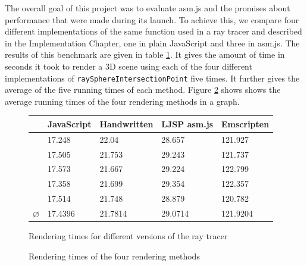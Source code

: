 \documentclass[11pt]{report}
\begin{document}
The overall goal of this project was to evaluate asm.js and the promises about performance that were made during its launch. To achieve this, we compare four different implementations of the same function used in a ray tracer and described in the Implementation Chapter, one in plain JavaScript and three in asm.js. The results of this benchmark are given in table \ref{benchmarks}. It gives the amount of time in seconds it took to render a 3D scene using each of the four different implementations of \texttt{raySphereIntersectionPoint} five times. It further gives the average of the five running times of each method. Figure \ref{benchmarksgraph} shows shows the average running times of the four rendering methods in a graph.

\begin{figure}[ht]
\begin{center}
  \begin{tabular}{ l | l | l | l | l }
    & JavaScript & Handwritten & LJSP asm.js & Emscripten \\ \hline
    & 17.248 & 22.04 & 28.657 & 121.927 \\
    & 17.505 & 21.753 & 29.243 & 121.737 \\
    & 17.573 & 21.667 & 29.224 & 122.799 \\
    & 17.358 & 21.699 & 29.354 & 122.357 \\
    & 17.514 & 21.748 & 28.879 & 120.782 \\ \hline
    $\varnothing$ & 17.4396 & 21.7814 & 29.0714 & 121.9204 \\
  \end{tabular}
\end{center}
\caption{Rendering times for different versions of the ray tracer}
\label{benchmarks}
\end{figure}


\begin{figure}[ht]



  
  \caption{Rendering times of the four rendering methods}
  \label{benchmarksgraph}
\end{figure}
\end{document}
